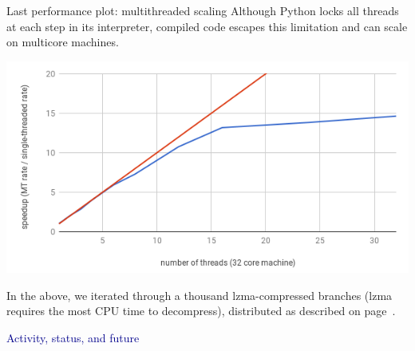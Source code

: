 \documentclass[aspectratio=169]{beamer}
\begin{document}
\begin{frame}{Last performance plot: multithreaded scaling}
\vspace{0.5 cm}
Although Python locks all threads at each step in its interpreter, compiled code escapes this limitation and can scale on multicore machines.

\begin{center}
\includegraphics[width=0.65\linewidth]{scaling.png}
\end{center}

In the above, we iterated through a thousand lzma-compressed branches (lzma requires the most CPU time to decompress), distributed as described on page~\pageref{page:executor}.
\end{frame}

\begin{frame}{}
\begin{center}
\Huge \textcolor{darkblue}{Activity, status, and future}
\end{center}
\end{frame}
\end{document}
